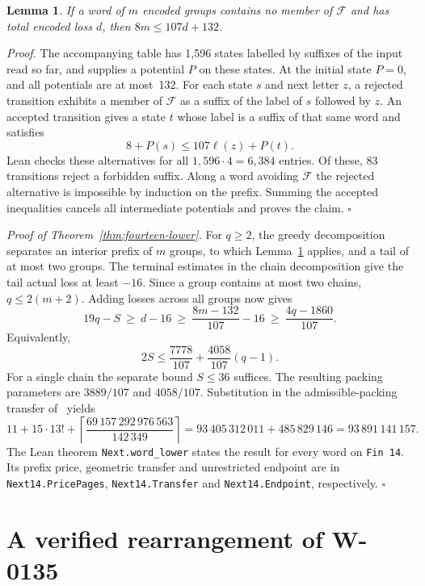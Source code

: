 \documentclass[11pt]{article}
\newtheorem{lemma}[theorem]{Lemma}
\newenvironment{proof}[1][Proof]{\par\smallskip\noindent\textit{#1.}\enspace}{\unskip\nobreak\hfill\ensuremath{\square}\par\smallskip}
\begin{document}
\begin{lemma}\label{lem:fourteen-price}
If a word of $m$ encoded groups contains no member of $\mathcal F$ and has total encoded loss $d$, then $8m\le107d+132$.
\end{lemma}
\begin{proof}
The accompanying table has 1,596 states labelled by suffixes of the input read so far, and supplies a potential $P$ on these states. At the initial state $P=0$, and all potentials are at most~132. For each state $s$ and next letter $z$, a rejected transition exhibits a member of $\mathcal F$ as a suffix of the label of $s$ followed by $z$. An accepted transition gives a state $t$ whose label is a suffix of that same word and satisfies
\[
                          8+P(s)\le107\ell(z)+P(t).
\]
Lean checks these alternatives for all $1{,}596\cdot4=6{,}384$ entries. Of these, 83 transitions reject a forbidden suffix. Along a word avoiding $\mathcal F$ the rejected alternative is impossible by induction on the prefix. Summing the accepted inequalities cancels all intermediate potentials and proves the claim.
\end{proof}

\begin{proof}[Proof of Theorem~\ref{thm:fourteen-lower}]
For $q\ge2$, the greedy decomposition separates an interior prefix of $m$ groups, to which Lemma~\ref{lem:fourteen-price} applies, and a tail of at most two groups. The terminal estimates in the chain decomposition give the tail actual loss at least $-16$. Since a group contains at most two chains, $q\le2(m+2)$. Adding losses across all groups now gives
\[
  19q-S\ \ge\ d-16\ \ge\ \frac{8m-132}{107}-16
                   \ \ge\ \frac{4q-1860}{107}.
\]
Equivalently,
\[
       2S\le \frac{7778}{107}+\frac{4058}{107}(q-1).
\]
For a single chain the separate bound $S\le36$ suffices. The resulting packing parameters are $3889/107$ and $4058/107$. Substitution in the admissible-packing transfer of~\cite{pantone} yields
\[
  11+15\cdot13!+
  \left\lceil\frac{69\,157\,292\,976\,563}{142\,349}\right\rceil
  =93\,405\,312\,011+485\,829\,146
  =93\,891\,141\,157 .
\]
The Lean theorem \texttt{Next.word\_lower} states the result for every word on \texttt{Fin 14}. Its prefix price, geometric transfer and unrestricted endpoint are in \texttt{Next14.PricePages}, \texttt{Next14.Transfer} and \texttt{Next14.Endpoint}, respectively.
\end{proof}

\section{A verified rearrangement of W-0135}
\label{sec:construction}
\end{document}
